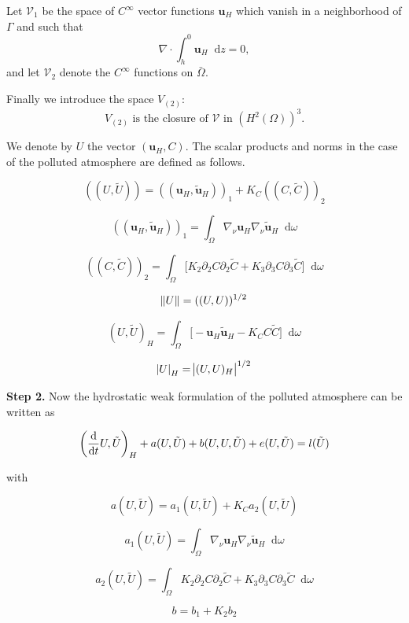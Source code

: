 \documentclass[11pt]{article}
\newcommand*\diff{\mathop{}\!\mathrm{d}}
\begin{document}
Let $\mathcal{V}_1$ be the space of $C^\infty$ vector functions $\mathbf{u}_H$ which vanish in a neighborhood of $\Gamma$ and such that $$\nabla \cdot \int_h^0 \mathbf{u}_H \diff z = 0,$$ and let $\mathcal{V}_2$ denote the $C^\infty$ functions on $\bar{\Omega}$.

Finally we introduce the space $V_{(2)}:$
$$ V_{(2)} \text{ is the closure of } \mathcal{V} \text{ in } (H^2(\Omega))^3.$$

We denote by $U$ the vector $(\mathbf{u}_H, C).$ The scalar products and norms in the case of the polluted atmosphere are defined as follows.

\[ ((U, \tilde{U})) = ((\mathbf{u}_H, \mathbf{\tilde{u}}_H))_1 + K_C ((C, \tilde{C}))_2 \]

\[ ((\mathbf{u}_H, \mathbf{\tilde{u}}_H))_1 = \int_\Omega \nabla_\nu \mathbf{u}_H \nabla_\nu \mathbf{\tilde{u}}_H \diff \omega \]

\[ ((C, \tilde{C}))_2 = \int _\Omega \big [ K_2 \partial_2 C \partial_2 \tilde{C} + K_3 \partial_3 C \partial_3 \tilde{C} \big ] \diff \omega \]

\[\norm{U} = ((U,U)) ^ {1/2}\]

\[ (U, \tilde{U})_H = \int _\Omega \big [ -\mathbf{u}_H \mathbf{\tilde{u}}_H - K_C C \tilde{C} \big ] \diff \omega \]

\[\abs{U}_H = \abs{(U,U)_H}^{1/2}\]

\textbf{Step 2.} Now the hydrostatic weak formulation of the polluted atmosphere can be written as

\begin{equation} \label{EXISTENCEFORMAT}
  \bigg ( \frac{\diff}{\diff t} U, \tilde{U} \bigg ) _H + a(U, \tilde{U}) + b(U,U,\tilde{U}) + e(U, \tilde{U}) = l(\tilde{U}) \\
\end{equation}

with

\[ a(U,\tilde{U}) = a_1 (U, \tilde{U}) + K_C a_2 (U, \tilde{U})\]

\[ a_1 (U, \tilde{U}) = \int_\Omega \nabla_\nu \mathbf{u}_H \nabla_\nu \mathbf{\tilde{u}}_H \diff \omega \]

\[ a_2 (U, \tilde{U}) = \int_\Omega K_2 \partial_2 C \partial_2 \tilde{C} + K_3 \partial_3 C \partial_3 \tilde{C} \diff \omega \]

\[ b = b_1 + K_2 b_2\]
\end{document}
